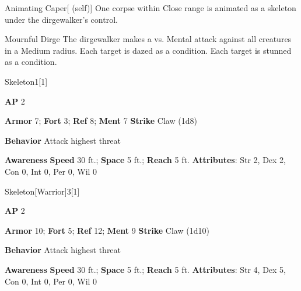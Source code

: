 \begin{attuneability}{Animating Caper}[ (self)]
One corpse within Close range is animated as a skeleton under the dirgewalker's control.
\end{attuneability}

\vspace{0.5em}
\begin{freeability}{Mournful Dirge}
The dirgewalker makes a  vs. Mental attack against all creatures in a Medium radius.
\hit Each target is dazed as a condition.
\crit Each target is stunned as a condition.
\end{freeability}

\begin{monsection}{Skeleton}{1}[1]
\vspace{-1em}\vspace{-1em}
\begin{spellcontent}
\begin{spelltargetinginfo}
{\textbf{AP} 2}

\pari \textbf{Armor} 7;
\textbf{Fort} 3;
\textbf{Ref} 8;
\textbf{Ment} 7
\pari \textbf{Strike} Claw  (1d8)



\pari \textbf{Behavior} Attack highest threat
\end{spelltargetinginfo}
\end{spellcontent}

\begin{monsterfooter}
\pari \textbf{Awareness} 
\pari \textbf{Speed} 30 ft.;
\textbf{Space} 5 ft.;
\textbf{Reach} 5 ft.
\pari \textbf{Attributes}:
Str 2,
Dex 2,
Con 0,
Int 0,
Per 0,
Wil 0
\end{monsterfooter}
\end{monsection}

\begin{monsection}{Skeleton}[Warrior]{3}[1]
\vspace{-1em}\vspace{-1em}
\begin{spellcontent}
\begin{spelltargetinginfo}
{\textbf{AP} 2}

\pari \textbf{Armor} 10;
\textbf{Fort} 5;
\textbf{Ref} 12;
\textbf{Ment} 9
\pari \textbf{Strike} Claw  (1d10)



\pari \textbf{Behavior} Attack highest threat
\end{spelltargetinginfo}
\end{spellcontent}

\begin{monsterfooter}
\pari \textbf{Awareness} 
\pari \textbf{Speed} 30 ft.;
\textbf{Space} 5 ft.;
\textbf{Reach} 5 ft.
\pari \textbf{Attributes}:
Str 4,
Dex 5,
Con 0,
Int 0,
Per 0,
Wil 0
\end{monsterfooter}
\end{monsection}

